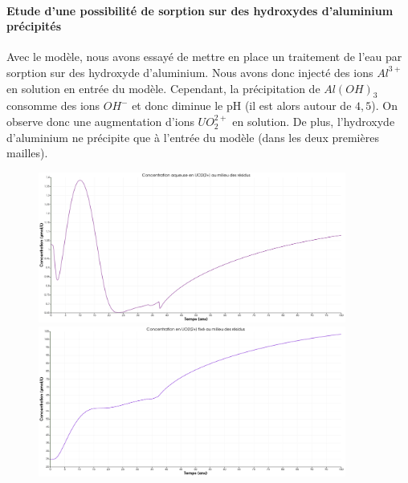 \documentclass{article}
\begin{document}
\paragraph{Etude d'une possibilité de sorption sur des hydroxydes d'aluminium précipités}
Avec le modèle, nous avons essayé de mettre en place un traitement de l’eau par sorption sur des hydroxyde d’aluminium. Nous avons donc injecté des ions $Al^{3+}$ en solution en entrée du modèle. Cependant, la précipitation de $Al(OH)_3$ consomme des ions $OH^{-}$ et donc diminue le pH (il est alors autour de $4,5$). On observe donc une augmentation d’ions $UO_2^{2+}$ en solution. De plus, l’hydroxyde d’aluminium ne précipite que à l’entrée du modèle (dans les deux premières mailles).

\begin{figure}[H]
    \centering
    \begin{minipage}{0.5\textwidth}
        \centering
        \includegraphics[width=0.9\textwidth]{III_B_2_18.png} 
        \caption{}
        \label{fig:UO2_residus_Al}
    \end{minipage}\hfill
    \begin{minipage}{0.5\textwidth}
        \centering
        \includegraphics[width=0.9\textwidth]{III_B_2_19.png} 
        \caption{}
        \label{fig:UO2_fixe_residus_Al}
    \end{minipage}
\end{figure}
\end{document}
